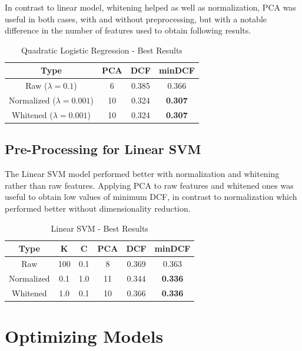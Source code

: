 \documentclass[12pt, twocolumn]{article}
\begin{document}
In contrast to linear model, whitening helped as well as normalization, PCA
was useful in both cases, with and without preprocessing, but with a notable difference
in the number of features used to obtain following results.

\begin{table}[H]
    \tiny
    \centering
        \begin{tabular}{||c|c|c|c||}
            \hline
            Type & PCA & DCF & minDCF \\
            \hline
            \hline
            Raw ($\lambda = 0.1$) & 6 & 0.385 &  0.366  \\
            Normalized ($\lambda = 0.001$) & 10 & 0.324 &  {\bf 0.307}  \\
            Whitened ($\lambda = 0.001$) & 10 & 0.324 &  {\bf 0.307}  \\
            \hline
    \end{tabular}
    \caption{Quadratic Logistic Regression - Best Results}
\end{table}

\subsection{Pre-Processing for Linear SVM}

The Linear SVM model performed better with normalization and whitening rather than raw features.
Applying PCA to raw features and whitened ones was useful to obtain low values of minimum DCF, in
contrast to normalization which performed better without dimensionality reduction.

\begin{table}[H]
    \centering
    \tiny
        \begin{tabular}{||c|c|c|c|c|c||}
            \hline
            Type & K & C & PCA & DCF & minDCF \\
            \hline
            \hline
            Raw & 100 & 0.1 & 8 & 0.369 &  0.363  \\
            Normalized & 0.1 & 1.0 & 11 & 0.344 &  {\bf 0.336}  \\
            Whitened & 1.0 & 0.1 & 10 & 0.366 &  {\bf 0.336}  \\
            \hline
    \end{tabular}
    \caption{Linear SVM - Best Results}
\end{table}

\section{Optimizing Models}
\end{document}
